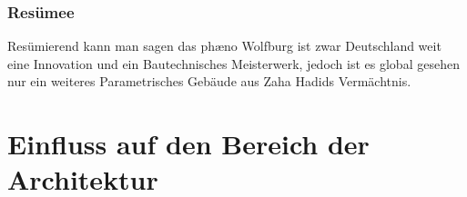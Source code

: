 \documentclass[a4paper, 12p]{article}
\begin{document}

\subsubsection{Resümee}
Resümierend kann man sagen das phæno Wolfburg ist zwar Deutschland weit eine
Innovation und ein Bautechnisches Meisterwerk, jedoch ist es global gesehen nur
ein weiteres Parametrisches Gebäude aus Zaha Hadids Vermächtnis. 

\section{Einfluss auf den Bereich der Architektur}
\end{document}
